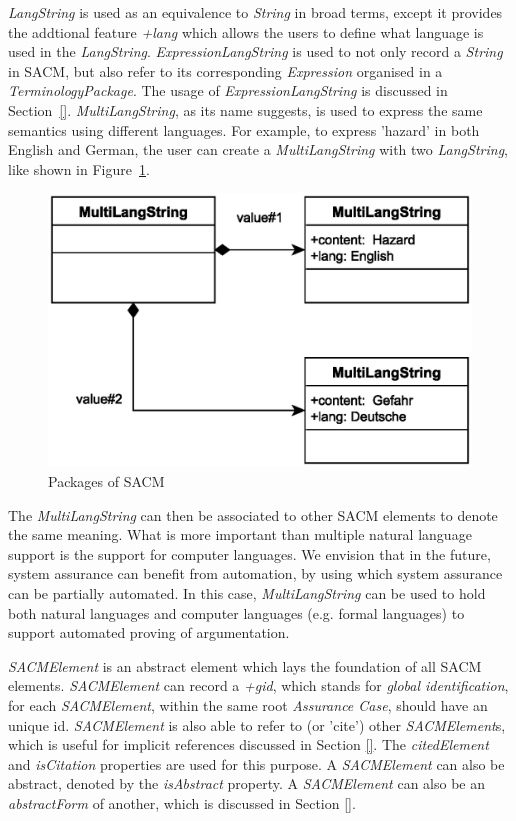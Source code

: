 \textit{LangString} is used as an equivalence to \textit{String} in broad terms, except it provides the addtional feature \textit{+lang} which allows the users to define what language is used in the \textit{LangString}. \textit{ExpressionLangString} is used to not only record a \textit{String} in SACM, but also refer to its corresponding \textit{Expression} organised in a \textit{TerminologyPackage}. The usage of \textit{ExpressionLangString} is discussed in Section~\ref{}. \textit{MultiLangString}, as its name suggests, is used to express the same semantics using different languages. For example, to express 'hazard' in both English and German, the user can create a \textit{MultiLangString} with two \textit{LangString}, like shown in Figure~\ref{fig:mulitiLang}.
\begin{figure}
	\centering
	\includegraphics[width=0.5\linewidth]{fig/MultiLangString.eps}
	\caption{Packages of SACM}
	\label{fig:mulitiLang}
\end{figure}
The \textit{MultiLangString} can then be associated to other SACM elements to denote the same meaning. What is more important than multiple natural language support is the support for computer languages. We envision that in the future, system assurance can benefit from automation, by using which system assurance can be partially automated. In this case, \textit{MultiLangString} can be used to hold both natural languages and computer languages (e.g. formal languages) to support automated proving of argumentation. 

\textit{SACMElement} is an abstract element which lays the foundation of all SACM elements. \textit{SACMElement} can record a \textit{+gid}, which stands for \textit{global identification}, for each \textit{SACMElement}, within the same root \textit{Assurance Case}, should have an unique id. \textit{SACMElement} is also able to refer to (or 'cite') other \textit{SACMElement}s, which is useful for implicit references discussed in Section \ref{}. The \textit{citedElement} and \textit{isCitation} properties are used for this purpose. A \textit{SACMElement} can also be abstract, denoted by the \textit{isAbstract} property. A \textit{SACMElement} can also be an \textit{abstractForm} of another, which is discussed in Section \ref{}. 

